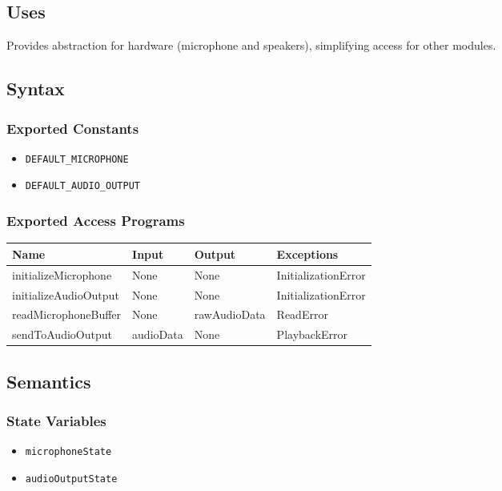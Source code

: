 \documentclass[12pt, titlepage]{article}
\begin{document}
\subsection{Uses}  
Provides abstraction for hardware (microphone and speakers), simplifying access for other modules.  

\subsection{Syntax}  

\subsubsection{Exported Constants}  
\begin{itemize}
    \item \texttt{DEFAULT\_MICROPHONE}  
    \item \texttt{DEFAULT\_AUDIO\_OUTPUT}  
\end{itemize}  

\subsubsection{Exported Access Programs}  
\begin{center}  
\begin{tabular}{|p{5cm}|p{2cm}|p{4cm}|p{3.5cm}|}  
\hline  
\textbf{Name} & \textbf{Input} & \textbf{Output} & \textbf{Exceptions} \\  
\hline  
initializeMicrophone & None & None & InitializationError \\  
initializeAudioOutput & None & None & InitializationError \\  
readMicrophoneBuffer & None & rawAudioData & ReadError \\  
sendToAudioOutput & audioData & None & PlaybackError \\  
\hline  
\end{tabular}  
\end{center}  

\subsection{Semantics}  

\subsubsection{State Variables}  
\begin{itemize}  
    \item \texttt{microphoneState}  
    \item \texttt{audioOutputState}  
\end{itemize}  
\end{document}
